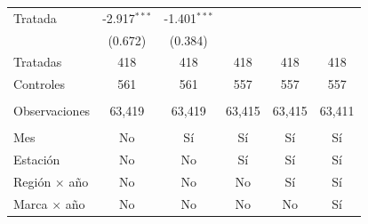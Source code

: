 \begin{tabular}{lccccc}
   Tratada              & -2.917$^{***}$ & -1.401$^{***}$ &                &                &   \\   
                        & (0.672)        & (0.384)        &                &                &   \\   
   Tratadas             & 418            & 418            & 418            & 418            & 418\\  
   Controles            & 561            & 561            & 557            & 557            & 557\\  
    \\
   Observaciones        & 63,419         & 63,419         & 63,415         & 63,415         & 63,411\\  
    \\
   Mes                  & No             & Sí             & Sí             & Sí             & Sí\\  
   Estación             & No             & No             & Sí             & Sí             & Sí\\  
   Región $\times$ año  & No             & No             & No             & Sí             & Sí\\  
   Marca $\times$ año   & No             & No             & No             & No             & Sí\\  
   \bottomrule
\end{tabular}
\par\endgroup



